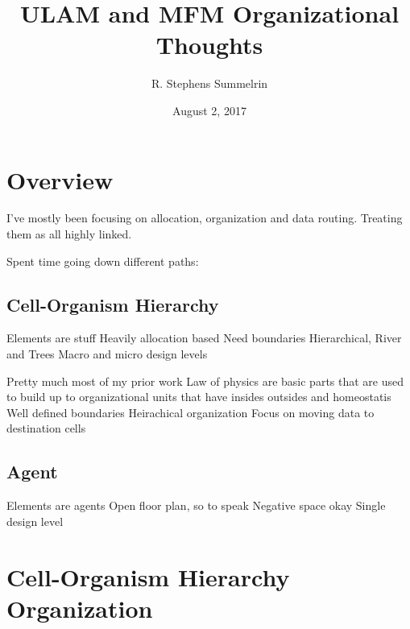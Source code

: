 \documentclass[article]{memoir}
\title{ULAM and MFM Organizational Thoughts}
\date{August 2, 2017}
\author{R. Stephens Summelrin}
\begin{document}
\maketitle
\tableofcontents


\chapter{Overview}

I've mostly been focusing on allocation, organization and data routing. 
Treating them as all highly linked.

Spent time going down different paths:



\section{Cell-Organism Hierarchy}

Elements are stuff
Heavily allocation based
Need boundaries
Hierarchical, River and Trees
Macro and micro design levels


Pretty much most of my prior work
Law of physics are basic parts that are used to build up to organizational units that have insides outsides and homeostatis
Well defined boundaries
Heirachical organization
Focus on moving data to destination cells



\section{Agent}

Elements are agents
Open floor plan, so to speak
Negative space okay
Single design level



\chapter{Cell-Organism Hierarchy Organization}
\end{document}
